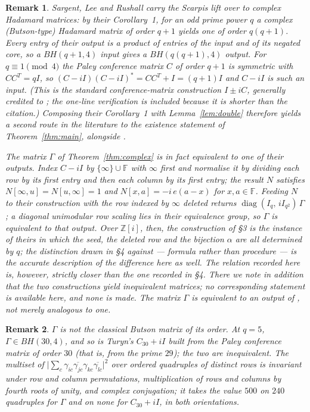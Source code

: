 \documentclass[11pt]{article}
\newtheorem{remark}{Remark}
\newcommand{\F}{\mathbb F}
\newcommand{\Z}{\mathbb Z}
\begin{document}
\begin{remark}\label{rem:slr}
Sargent, Lee and Rushall \cite{SargentLeeRushall2024} carry the Scarpis lift
over to complex Hadamard matrices: by their Corollary~1, for an odd prime
power \(q\) a complex (Butson-type) Hadamard matrix of order \(q+1\) yields
one of order \(q(q+1)\).  Every entry of their output is a product of
entries of the input and of its negated core, so a \(BH(q+1,4)\) input
gives a \(BH(q(q+1),4)\) output.  For \(q\equiv1\pmod4\) the Paley
conference matrix \(C\) of order \(q+1\) is symmetric with \(CC^{T}=qI\), so
\((C-iI)(C-iI)^{*}=CC^{T}+I=(q+1)I\) and \(C-iI\) is such an input.  (This
is the standard conference-matrix construction \(I\pm iC\), generally
credited to \cite{Turyn1970}; the one-line verification is included because
it is shorter than the citation.)
Composing their Corollary~1 with Lemma~\ref{lem:double} therefore yields a
second route in the literature to the existence statement of
Theorem~\ref{thm:main}, alongside \cite{FaroukWang2020}.

The matrix \(\Gamma\) of Theorem~\ref{thm:complex} is in fact equivalent to
one of their outputs.  Index \(C-iI\) by \(\{\infty\}\cup\F\) with \(\infty\) first and
normalise it by dividing each row by its first entry and then each column by
its first entry; the result \(N\) satisfies \(N[\infty,u]=N[u,\infty]=1\)
and \(N[x,a]=-i\,e(a-x)\) for \(x,a\in\F\).  Feeding \(N\) to their
construction with the row indexed by \(\infty\) deleted returns
\(\operatorname{diag}(I_q,\,iI_{q^{2}})\,\Gamma\); a diagonal unimodular row
scaling lies in their equivalence group, so \(\Gamma\) is equivalent to that
output.  Over \(\Z[i]\), then, the construction of \S3 is the instance of
theirs in which the seed, the deleted row and the bijection \(\alpha\) are
all determined by \(q\); the distinction drawn in \S4 against
\cite{FaroukWang2020} --- formula rather than procedure --- is the accurate
description of the difference here as well.  The relation recorded here is,
however, strictly closer than the one recorded in \S4.  There we note in
addition that the two constructions yield inequivalent matrices; no
corresponding statement is available here, and none is made.  The matrix
\(\Gamma\) is equivalent to an output of \cite{SargentLeeRushall2024}, not
merely analogous to one.
\end{remark}

\begin{remark}\label{rem:c30}
\(\Gamma\) is not the classical Butson matrix of its order.  At \(q=5\),
\(\Gamma\in BH(30,4)\), and so is Turyn's \(C_{30}+iI\) built from the Paley
conference matrix of order \(30\) (that is, from the prime \(29\)); the two
are inequivalent.  The multiset of
\(\bigl|\sum_{c}\gamma_{ic}\overline{\gamma_{jc}}\gamma_{kc}
\overline{\gamma_{lc}}\bigr|^{2}\) over ordered quadruples of distinct rows
is invariant under row and column permutations, multiplication of rows and
columns by fourth roots of unity, and complex conjugation; it takes the
value \(500\) on \(240\) quadruples for \(\Gamma\) and on none for
\(C_{30}+iI\), in both orientations.
\end{remark}
\end{document}
